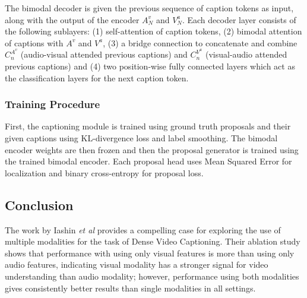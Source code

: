 The bimodal decoder is given the previous sequence of caption tokens as input, along with 
the output of the encoder $A^v_N$ and $V^a_N$. Each decoder layer consists of the following 
sublayers: (1) self-attention of caption tokens, (2) bimodal attention of captions with 
$A^v$ and $V^a$, (3) a bridge connection to concatenate and combine $C_n^{A^v}$ 
(audio-visual attended previous captions) and $C_n^{V^a}$ (visual-audio attended previous 
captions) and (4) two position-wise fully connected layers which act as the classification 
layers for the next caption token.\par


\subsubsection{Training Procedure}
\par
First, the captioning module is trained using ground truth proposals and their given 
captions using KL-divergence loss and label smoothing. The bimodal encoder weights are then 
frozen and then the proposal generator is trained using the trained bimodal encoder. Each 
proposal head uses Mean Squared Error for localization and binary cross-entropy for proposal 
loss.\par


\subsection{Conclusion}
\par The work by Iashin \textit{et al} provides a compelling case for exploring the use of 
multiple modalities for the task of Dense Video Captioning. Their ablation study shows that 
performance with using only visual features is more than using only audio features, 
indicating visual modality has a stronger signal for video understanding than audio 
modality; however, performance using both modalities gives consistently better results than 
single modalities in all settings.
